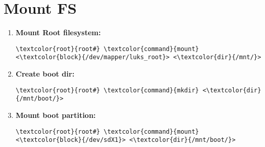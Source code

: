 \documentclass[10pt, a4paper, onecolumn, openany]{book} %
\begin{document}
\section{Mount FS}
\label{mount_fs}
\begin{enumerate}
    \item \textbf{Mount Root filesystem:}
\begin{Verbatim}[commandchars=\\\{\}]
\textcolor{root}{root#} \textcolor{command}{mount} <\textcolor{block}{/dev/mapper/luks_root}> <\textcolor{dir}{/mnt/}>
\end{Verbatim}

    \item \textbf{Create boot dir:}
\begin{Verbatim}[commandchars=\\\{\}]
\textcolor{root}{root#} \textcolor{command}{mkdir} <\textcolor{dir}{/mnt/boot/}>
\end{Verbatim}
    \item \textbf{Mount boot partition:}
\begin{Verbatim}[commandchars=\\\{\}]
\textcolor{root}{root#} \textcolor{command}{mount} <\textcolor{block}{/dev/sdX1}> <\textcolor{dir}{/mnt/boot/}>
\end{Verbatim}
\end{enumerate}
\end{document}

